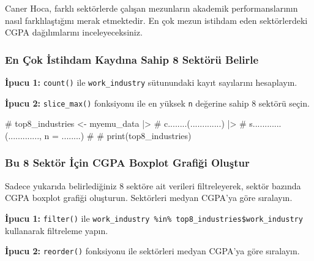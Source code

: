 \documentclass[
  11pt,
  a4paper,
  DIV=11,
  numbers=noendperiod]{scrartcl}
\newenvironment{Shaded}{\begin{snugshade}}{\end{snugshade}}
\newcommand{\CommentTok}[1]{\textcolor[rgb]{0.37,0.37,0.37}{#1}}
\begin{document}
Caner Hoca, farklı sektörlerde çalışan mezunların akademik
performanslarının nasıl farklılaştığını merak etmektedir. En çok mezun
istihdam eden sektörlerdeki CGPA dağılımlarını inceleyeceksiniz.

\subsubsection{En Çok İstihdam Kaydına Sahip 8 Sektörü
Belirle}\label{en-uxe7ok-istihdam-kaydux131na-sahip-8-sektuxf6ruxfc-belirle}

\textbf{İpucu 1:} \texttt{count()} ile \texttt{work\_industry}
sütunundaki kayıt sayılarını hesaplayın.

\textbf{İpucu 2:} \texttt{slice\_max()} fonksiyonu ile en yüksek
\texttt{n} değerine sahip 8 sektörü seçin.

\begin{Shaded}
\begin{Highlighting}[]
\CommentTok{\# top8\_industries \textless{}{-} myemu\_data |\textgreater{}}
\CommentTok{\#   c........(.............) |\textgreater{}}
\CommentTok{\#   s............(............., n = ........)}
\CommentTok{\#}
\CommentTok{\# print(top8\_industries)}
\end{Highlighting}
\end{Shaded}

\subsubsection{Bu 8 Sektör İçin CGPA Boxplot Grafiği
Oluştur}\label{bu-8-sektuxf6r-iuxe7in-cgpa-boxplot-grafiux11fi-oluux15ftur}

Sadece yukarıda belirlediğiniz 8 sektöre ait verileri filtreleyerek,
sektör bazında CGPA boxplot grafiği oluşturun. Sektörleri medyan CGPA'ya
göre sıralayın.

\textbf{İpucu 1:} \texttt{filter()} ile
\texttt{work\_industry\ \%in\%\ top8\_industries\$work\_industry}
kullanarak filtreleme yapın.

\textbf{İpucu 2:} \texttt{reorder()} fonksiyonu ile sektörleri medyan
CGPA'ya göre sıralayın.

\begin{Shaded}
\end{Shaded}
\end{document}
